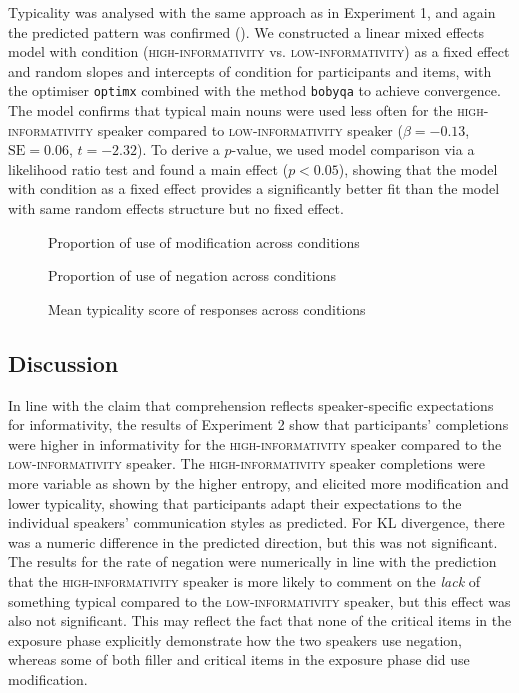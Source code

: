 \documentclass[output=paper,colorlinks,citecolor=brown]{langscibook}
\begin{document}
Typicality was analysed with the same approach as in Experiment 1, and again the predicted pattern was confirmed (). We constructed a linear mixed effects model with condition (\textsc{high-informativity} vs. \textsc{low-informativity}) as a fixed effect and random slopes and intercepts of condition for participants and items, with the optimiser \texttt{optimx} combined with the method \texttt{bobyqa} to achieve convergence. The model confirms that typical main nouns were used less often for the \textsc{high-informativity} speaker compared to \textsc{low-informativity} speaker ($\beta = -0.13$, $\text{SE} = 0.06$, $t = -2.32$). To derive a $p$-value, we used model comparison via a likelihood ratio test and found a main effect ($p < 0.05$), showing that the model with condition as a fixed effect provides a significantly better fit than the model with same random effects structure but no fixed effect.

\begin{figure}
    \begin{floatrow}
    {\caption{Proportion of use of modification across conditions}\label{Exp2Mod}}
    {\caption{Proportion of use of negation across conditions}\label{Exp2Neg}}
    {\caption{Mean typicality score of responses across conditions}\label{Exp2Typ}}
    \end{floatrow}
\end{figure}

\subsection{Discussion}

In line with the claim that comprehension reflects speaker-specific expectations for informativity, the results of Experiment 2 show that participants’ completions were higher in informativity for the \textsc{high-informativity} speaker compared to the \textsc{low-informativity} speaker. The \textsc{high-informativity} speaker completions were more variable as shown by the higher entropy, and elicited more modification and lower typicality, showing that participants adapt their expectations to the individual speakers’ communication styles as predicted. For KL divergence, there was a numeric difference in the predicted direction, but this was not significant. The results for the rate of negation were numerically in line with the prediction that the \textsc{high-informativity} speaker is more likely to comment on the \textit{lack} of something typical compared to the \textsc{low-informativity} speaker, but this effect was also not significant. This may reflect the fact that none of the critical items in the exposure phase explicitly demonstrate how the two speakers use negation, whereas some of both filler and critical items in the exposure phase did use modification.
\end{document}
